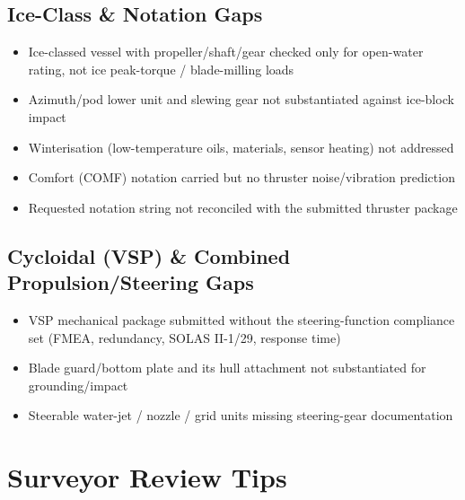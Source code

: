 \documentclass[11pt,a4paper]{report}
\begin{document}
\subsection{Ice-Class \& Notation Gaps}
\begin{itemize}[leftmargin=*]
\item Ice-classed vessel with propeller/shaft/gear checked only for open-water rating, not ice peak-torque / blade-milling loads
\item Azimuth/pod lower unit and slewing gear not substantiated against ice-block impact
\item Winterisation (low-temperature oils, materials, sensor heating) not addressed
\item Comfort (COMF) notation carried but no thruster noise/vibration prediction
\item Requested notation string not reconciled with the submitted thruster package
\end{itemize}

\subsection{Cycloidal (VSP) \& Combined Propulsion/Steering Gaps}
\begin{itemize}[leftmargin=*]
\item VSP mechanical package submitted without the steering-function compliance set (FMEA, redundancy, SOLAS II-1/29, response time)
\item Blade guard/bottom plate and its hull attachment not substantiated for grounding/impact
\item Steerable water-jet / nozzle / grid units missing steering-gear documentation
\end{itemize}

\section{Surveyor Review Tips}
\end{document}
